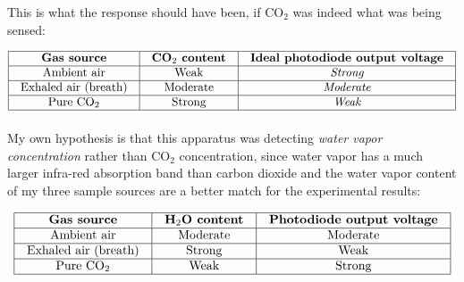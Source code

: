 This is what the response should have been, if CO$_{2}$ was indeed what was being sensed:


$$\vbox{\offinterlineskip
\halign{\strut
\vrule \quad\hfil # \ \hfil & 
\vrule \quad\hfil # \ \hfil & 
\vrule \quad\hfil # \ \hfil \vrule \cr
\noalign{\hrule}
%
{\bf Gas source} & {\bf CO$_{2}$ content} & {\bf Ideal photodiode output voltage} \cr
%
\noalign{\hrule}
%
Ambient air & Weak & {\it Strong} \cr
%
\noalign{\hrule}
%
Exhaled air (breath) & Moderate & {\it Moderate} \cr
%
\noalign{\hrule}
%
Pure CO$_{2}$ & Strong & {\it Weak} \cr
%
\noalign{\hrule}
} %
}$$ %








My own hypothesis is that this apparatus was detecting {\it water vapor concentration} rather than CO$_{2}$ concentration, since water vapor has a much larger infra-red absorption band than carbon dioxide and the water vapor content of my three sample sources are a better match for the experimental results: 


$$\vbox{\offinterlineskip
\halign{\strut
\vrule \quad\hfil # \ \hfil & 
\vrule \quad\hfil # \ \hfil & 
\vrule \quad\hfil # \ \hfil \vrule \cr
\noalign{\hrule}
%
{\bf Gas source} & {\bf H$_{2}$O content} & {\bf Photodiode output voltage} \cr
%
\noalign{\hrule}
%
Ambient air & Moderate & Moderate \cr
%
\noalign{\hrule}
%
Exhaled air (breath) & Strong & Weak \cr
%
\noalign{\hrule}
%
Pure CO$_{2}$ & Weak & Strong \cr
%
\noalign{\hrule}
} %
}$$ %





